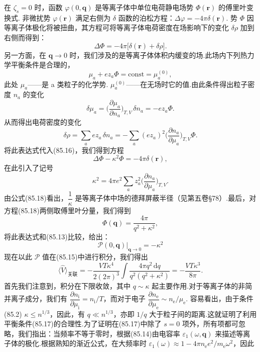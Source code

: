 在 $\zeta_s=0$ 时，函数 $\varphi(0,\bm{q})$ 是等离子体中单位电荷静电场势 $\varPhi(\bm{r})$ 的傅里叶变换式. 非微扰势 $\varphi(\bm{r})$ 满足右侧为 $\delta$ 函数的泊松方程：$\Delta\varphi=-4\pi\delta(\bm{r})$. 势 $\varPhi$ 因等离子体极化将被扭曲，其方程可将等离子体电荷密度在场影响下的变化 $\delta\rho$ 加到右侧而得到：
\begin{equation}
  \Delta\varPhi=-4\pi\bigl[\delta(\bm{r})+\delta\rho\bigr].
\end{equation}
另一方面，在 $\bm{q}\to 0$ 时，我们涉及的是等离子体体积内缓变的场.此场内下列热力学平衡条件是合理的，
\begin{equation}
  \mu_a+ez_a\varPhi=\mathrm{const}=\mu^{(0)}_a,
\end{equation}
此处 $\mu_a$——是 a 类粒子的化学势. $\mu^{(0)}_a$——在无场时它的值.由此条件得出粒子密度 $n_a$ 的变化
\begin{equation*}
  \delta\mu_a=\biggl(\frac{\partial\mu_a}{\partial n_a}\biggr)_{T,V}\,\delta n_a=-ez_a\varPhi.
\end{equation*}
从而得出电荷密度的变化
\begin{equation*}
  \delta\rho=\sum_{a}ez_a\,\delta n_a=-\sum_{a}(ez_a)^{2}\biggl(\frac{\partial n_a}{\partial\mu_a}\biggr)_{T,V}\varPhi.
\end{equation*}
将此表达式代入(85.16)，我们得到方程
\begin{equation}
  \Delta\varPhi-\kappa^{2}\varPhi=-4\pi\delta(\bm{r}),
\end{equation}
在此引入了记号
\begin{equation}
  \kappa^{2}=4\pi e^{2}\sum_{a}z_a^{2}\biggl(\frac{\partial n_a}{\partial\mu_a}\biggr)_{T,V}.
\end{equation}
由公式(85.18)看出，$\dfrac{1}{\kappa}$ 是等离子体中场的德拜屏蔽半径（见第五卷§78）.最后，对方程(85.18)两侧取傅里叶分量，我们得到
\begin{equation*}
  \varPhi(\bm{q})=\frac{4\pi}{q^{2}+\kappa^{2}},
\end{equation*}
将此表达式和(85.13)比较，给出：
\begin{equation}
  \mathcal{P}(0,\bm{q})\bigg|_{\bm{q}\to 0}=-\kappa^{2}
\end{equation}
现在以此 $\mathcal{P}$ 值在(85.15)中进行积分，我们得出
\begin{equation}
  \bigl\langle\hat{V}\bigr\rangle_{\text{关联}}=-\frac{VT\kappa^{4}}{2(2\pi)^{3}}\int\frac{4\pi q^{2}\,\mathrm{d}q}{q^{2}(q^{2}+\kappa^{2})}=-\frac{VT\kappa^{3}}{8\pi}.
\end{equation}
首先我们注意到，积分在下限收敛，其中 $q\sim\kappa$ 起主要作用.对于等离子体的非简并离子成分，我们有 $\dfrac{\partial n_{\mathrm{i}}}{\partial\mu_{\mathrm{i}}}=n_{\mathrm{i}}/T$，而对于电子 $\dfrac{\partial n_{\mathrm{e}}}{\partial\mu_{\mathrm{e}}}\sim n_{\mathrm{e}}/\mu_{\mathrm{e}}$. 容易看出，由于条件(85.2) $\kappa\leqslant n^{1/3}$，因此，有 $q\ll n^{1/3}$，亦即 $1/q$ 大于粒子间的距离.这就证明了利用平衡条件(85.17)的合理性.为了证明在(85.17)中除了 $s=0$ 项外，所有项都可忽略，我们指出：当频率不等于零时，根据(85.14)由电容率 $\varepsilon_1(\omega,\bm{q})$ 来描述等离子体的极化.根据熟知的渐近公式，在大频率时 $\varepsilon_1(\omega)\approx 1-4\pi n_{\mathrm{e}}e^{2}/m_{\mathrm{e}}\omega^{2}$，因此
